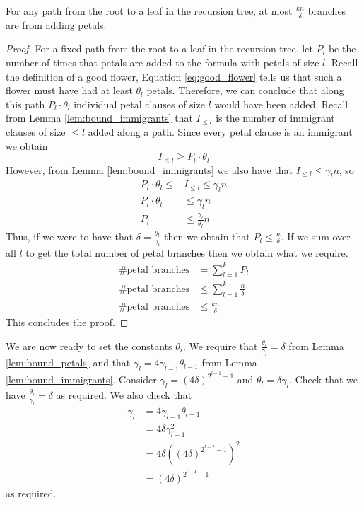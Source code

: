 \begin{lemma} \label{lem:bound_petals}
    For any path from the root to a leaf in the recursion tree, at most $\frac{kn}{\delta}$ branches
    are from adding petals.
\end{lemma}
\begin{proof}
    For a fixed path from the root to a leaf in the recursion tree, let $P_l$ be the number of times 
    that petals are added to the formula with petals of size $l$.
    Recall the definition of a good flower,
    Equation \ref{eq:good_flower} tells us that such a flower must have had at least $\theta_{l}$
    petals. Therefore, we can conclude that along this path $P_l \cdot \theta_l$ individual petal
    clauses of size $l$ would have been added. Recall from Lemma \ref{lem:bound_immigrants} that
    $I_{\leq l}$ is the number of immigrant clauses of size $\leq l$ added along a path. Since every petal
    clause is an immigrant we obtain
    \begin{equation}
        I_{\leq l} \geq P_l \cdot \theta_l
    \end{equation}
    However, from Lemma \ref{lem:bound_immigrants} we also have that $I_{\leq l} \leq \gamma_l n$, so
    \begin{align*}
        P_l \cdot \theta_l \leq &I_{\leq l} \leq \gamma_l n \\
        P_l \cdot \theta_l &\leq \gamma_l n \\
        P_l &\leq \frac{\gamma_l}{\theta_l}n
    \end{align*}
    Thus, if we were to have that $\delta = \frac{\theta_l}{\gamma_l}$ then we obtain that $P_l \leq \frac{n}{\delta}$.
    If we sum over all $l$ to get the total number of petal branches then we obtain what we require.
    \begin{align*}
        \text{\#petal branches} &= \sum_{l=1}^{k} P_l \\
        \text{\#petal branches} &\leq \sum_{l=1}^{k} \frac{n}{\delta} \\
        \text{\#petal branches} &\leq \frac{kn}{\delta}
    \end{align*}
    This concludes the proof.
\end{proof}

We are now ready to set the constants $\theta_i$. We require that $\frac{\theta_l}{\gamma_l} = \delta$
from Lemma \ref{lem:bound_petals}
and that $\gamma_l = 4\gamma_{l-1}\theta_{l-1}$ from Lemma \ref{lem:bound_immigrants}.
Consider $\gamma_{l} = (4\delta)^{2^{l-1}-1}$ and $\theta_{l} = \delta \gamma_l$. Check that we have $\frac{\theta_l}{\gamma_l} = \delta$
as required. We also check that
\begin{align*}
    \gamma_l &= 4 \gamma_{l-1} \theta_{l-1} \\
    &= 4 \delta \gamma_{l-1}^2 \\
    &= 4 \delta ((4\delta)^{2^{l-2}-1})^2 \\
    &= (4\delta)^{2^{l-1}-1}
\end{align*}
as required.

